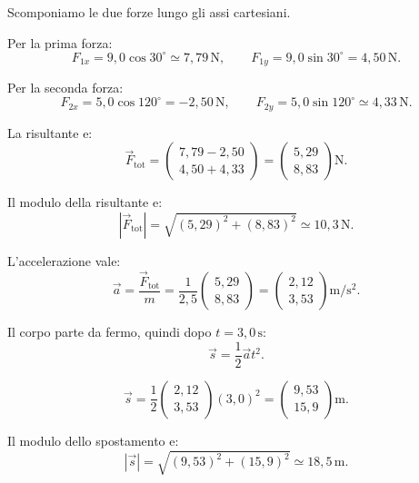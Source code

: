 \begin{soluzione}
Scomponiamo le due forze lungo gli assi cartesiani.

Per la prima forza:
\[
F_{1x}=9{,}0\cos 30^\circ\simeq 7{,}79\,\mathrm{N},
\qquad
F_{1y}=9{,}0\sin 30^\circ=4{,}50\,\mathrm{N}.
\]

Per la seconda forza:
\[
F_{2x}=5{,}0\cos 120^\circ=-2{,}50\,\mathrm{N},
\qquad
F_{2y}=5{,}0\sin 120^\circ\simeq 4{,}33\,\mathrm{N}.
\]

La risultante e:
\[
\vec F_\text{tot}=
\begin{pmatrix}
7{,}79-2{,}50\\[4pt]
4{,}50+4{,}33
\end{pmatrix}
=
\begin{pmatrix}
5{,}29\\[4pt]
8{,}83
\end{pmatrix}
\mathrm{N}.
\]

Il modulo della risultante e:
\[
|\vec F_\text{tot}|
=\sqrt{(5{,}29)^2+(8{,}83)^2}
\simeq 10{,}3\,\mathrm{N}.
\]

L'accelerazione vale:
\[
\vec a=\frac{\vec F_\text{tot}}{m}
=\frac{1}{2{,}5}
\begin{pmatrix}
5{,}29\\[4pt]
8{,}83
\end{pmatrix}
=
\begin{pmatrix}
2{,}12\\[4pt]
3{,}53
\end{pmatrix}
\mathrm{m/s^2}.
\]

Il corpo parte da fermo, quindi dopo \(t=3{,}0\,\mathrm{s}\):
\[
\vec s=\frac{1}{2}\vec a t^2.
\]

\[
\vec s=
\frac{1}{2}
\begin{pmatrix}
2{,}12\\[4pt]
3{,}53
\end{pmatrix}
(3{,}0)^2
=
\begin{pmatrix}
9{,}53\\[4pt]
15{,}9
\end{pmatrix}
\mathrm{m}.
\]

Il modulo dello spostamento e:
\[
|\vec s|=\sqrt{(9{,}53)^2+(15{,}9)^2}
\simeq 18{,}5\,\mathrm{m}.
\]
\end{soluzione}
